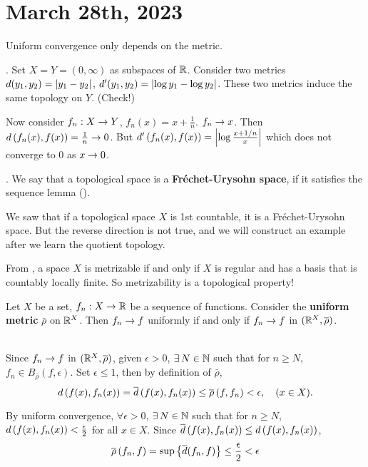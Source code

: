 \section*{March 28th, 2023}

Uniform convergence only depends on the metric.

\ex. Set \(X = Y = (0, \infty)\) as subspaces of \(\mathbb{R}\). Consider two metrics \(d(y_1, y_2) = \left| y_1 - y_2 \right|\), \(d'(y_1, y_2) = \left| \log y_1 - \log y_2 \right|\). These two metrics induce the same topology on \(Y\). (Check!)

Now consider \(f_n : X \rightarrow Y\), \(f_n(x) = x + \frac{1}{n}\). \(f_n \rightarrow x\). Then \(d\left( f_n(x), f(x) \right) = \frac{1}{n} \rightarrow 0\). But \(d'\left( f_n(x), f(x) \right) = \left| \log\frac{x + 1/n}{x} \right|\) which does not converge to 0 as \(x \rightarrow 0\).

. We say that a topological space is a \textbf{Fréchet-Urysohn space}, if it satisfies the sequence lemma ().

\rmk We saw that if a topological space \(X\) is 1st countable, it is a Fréchet-Urysohn space. But the reverse direction is not true, and we will construct an example after we learn the quotient topology.

\rmk From  , a space \(X\) is metrizable if and only if \(X\) is regular and has a basis that is countably locally finite. So metrizability is a topological property!

\rmk Let \(X\) be a set, \(f_n : X \rightarrow \mathbb{R}\) be a sequence of functions. Consider the \textbf{uniform metric} \(\bar{\rho}\) on \(\mathbb{R}^X\). Then \(f_n \rightarrow f\) uniformly if and only if \(f_n \rightarrow f\) in \((\mathbb{R}^X, \overline{\rho})\).

\pf \\
\note{\mimpd} Since \(f_n \rightarrow f\) in \((\mathbb{R}^X, \overline{\rho})\), given \(\epsilon > 0\), \(\exists N \in \N\) such that for \(n \geq N\), \(f_n \in B_{\bar{\rho}}(f, \epsilon)\). Set \(\epsilon \leq 1\), then by definition of \(\bar{\rho}\),
\[
    d\left( f(x), f_n(x) \right)= \overline{d}\left( f(x), f_n(x) \right) \leq \overline{\rho}\left( f, f_n \right) < \epsilon, \quad (x \in X).
\]

\note{\mimp} By uniform convergence, \(\forall \epsilon > 0\), \(\exists N \in \N\) such that for \(n \geq N\), \(d\left( f(x), f_n(x) \right) < \frac{\epsilon}{2}\) for all \(x \in X\). Since \(\overline{d}\left( f(x), f_n(x) \right) \leq d\left( f(x), f_n(x) \right)\),
\[
    \overline{\rho}\left( f_n, f \right) = \sup\left\{\overline{d}(f_n, f)\right\} \leq \frac{\epsilon}{2} < \epsilon
\]

